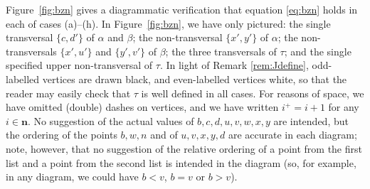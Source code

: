 \documentclass[11pt,a4paper]{article}
\newcommand{\bn}{\mathbf{n}}
\newcommand{\al}{\alpha}
\newcommand{\be}{\beta}
\newcommand{\1}{\id_n}
\numberwithin{equation}{section}
\theoremstyle{definition}
\begin{document}
\begin{itemize}
\begin{itemize}
\begin{itemize}
\begin{itemize}
\begin{itemize}
\begin{itemize}
\begin{itemize}
\begin{itemize}
\begin{itemize}
Figure~\ref{fig:bzn} gives a diagrammatic verification that equation \eqref{eq:bzn} holds in each of cases (a)--(h).  In Figure~\ref{fig:bzn}, we have only pictured: the single transversal $\{c,d'\}$ of $\al$ and $\be$; the non-transversal $\{x',y'\}$ of $\al$; the non-transversals $\{x',u'\}$ and $\{y',v'\}$ of $\be$; the three transversals of $\tau$; and the single specified upper non-transversal of $\tau$.  In light of Remark \ref{rem:Jdefine}, odd-labelled vertices are drawn black, and even-labelled vertices white, so that the reader may easily check that $\tau$ is well defined in all cases.  For reasons of space, we have omitted (double) dashes on vertices, and we have written $i^+=i+1$ for any~$i\in\bn$.  No suggestion of the actual values of $b,c,d,u,v,w,x,y$ are intended, but the ordering of the points $b,w,n$ and of $u,v,x,y,d$ are accurate in each diagram; note, however, that no suggestion of the relative ordering of a point from the first list and a point from the second list is intended in the diagram (so, for example, in any diagram, we could have $b<v$, $b=v$ or $b>v$).



\end{itemize}
\end{itemize}
\end{itemize}
\end{itemize}
\end{itemize}
\end{itemize}
\end{itemize}
\end{itemize}
\end{itemize}
\end{document}
